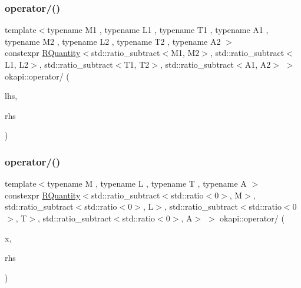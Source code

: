 \subsubsection{\texorpdfstring{operator/()}{operator/()}\hspace{0.1cm}{\footnotesize\ttfamily [1/3]}}
{\footnotesize\ttfamily template$<$typename M1 , typename L1 , typename T1 , typename A1 , typename M2 , typename L2 , typename T2 , typename A2 $>$ \\
constexpr \mbox{\hyperlink{classokapi_1_1RQuantity}{R\+Quantity}}$<$std\+::ratio\+\_\+subtract$<$M1, M2$>$, std\+::ratio\+\_\+subtract$<$L1, L2$>$, std\+::ratio\+\_\+subtract$<$T1, T2$>$, std\+::ratio\+\_\+subtract$<$A1, A2$>$ $>$ okapi\+::operator/ (\begin{DoxyParamCaption}\item[{const \mbox{\hyperlink{classokapi_1_1RQuantity}{R\+Quantity}}$<$ M1, L1, T1, A1 $>$ \&}]{lhs,  }\item[{const \mbox{\hyperlink{classokapi_1_1RQuantity}{R\+Quantity}}$<$ M2, L2, T2, A2 $>$ \&}]{rhs }\end{DoxyParamCaption})}

\mbox{\label{namespaceokapi_a531581f5f3bfed446a0925214c0e4664}} 
\subsubsection{\texorpdfstring{operator/()}{operator/()}\hspace{0.1cm}{\footnotesize\ttfamily [2/3]}}
{\footnotesize\ttfamily template$<$typename M , typename L , typename T , typename A $>$ \\
constexpr \mbox{\hyperlink{classokapi_1_1RQuantity}{R\+Quantity}}$<$std\+::ratio\+\_\+subtract$<$std\+::ratio$<$0$>$, M$>$, std\+::ratio\+\_\+subtract$<$std\+::ratio$<$0$>$, L$>$, std\+::ratio\+\_\+subtract$<$std\+::ratio$<$0$>$, T$>$, std\+::ratio\+\_\+subtract$<$std\+::ratio$<$0$>$, A$>$ $>$ okapi\+::operator/ (\begin{DoxyParamCaption}\item[{const double \&}]{x,  }\item[{const \mbox{\hyperlink{classokapi_1_1RQuantity}{R\+Quantity}}$<$ M, L, T, A $>$ \&}]{rhs }\end{DoxyParamCaption})}

\mbox{\label{namespaceokapi_aae60324b5422706049e94e1a7b0b96af}} 
